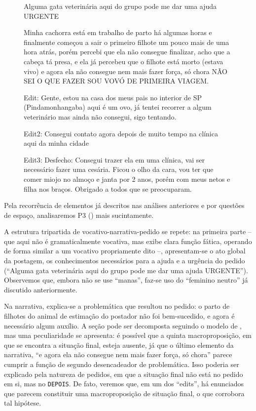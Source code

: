 \documentclass{textolivre-html}
\begin{document}
\begin{figure}[htbp]
\begin{minipage}{0.5\textwidth}
 Alguma gata veterinária aqui do grupo pode me dar uma ajuda URGENTE

Minha cachorra está em trabalho de parto há algumas horas e finalmente começou a sair o primeiro filhote um pouco mais de uma hora atrás, porém percebi que ela não consegue finalizar, acho que a cabeça tá presa, e ela já percebeu que o filhote está morto (estava vivo) e agora ela não consegue nem mais fazer força, só chora NÃO SEI O QUE FAZER SOU VOVÓ DE PRIMEIRA VIAGEM.

Edit: Gente, estou na casa dos meus pais no interior de SP (Pindamonhangaba) aqui é um ovo, já tentei recorrer a algum veterinário mas ainda não consegui, sigo tentando.

Edit2: Consegui contato agora depois de muito tempo na clínica aqui da minha cidade

Edit3: Desfecho: Consegui trazer ela em uma clínica, vai ser necessário fazer uma cesária. Ficou o olho da cara, vou ter que comer miojo no almoço e janta por 2 anos, porém com meus netos e filha nos braços. Obrigado a todos que se preocuparam.
\end{minipage}
\end{figure}

Pela recorrência de elementos já descritos nas análises anteriores e por questões de espaço, analisaremos P3 () mais sucintamente.

A estrutura tripartida de vocativo-narrativa-pedido se repete: na primeira parte – que aqui não é gramaticalmente vocativa, mas exibe clara função fática, operando de forma similar a um vocativo propriamente dito –, apresentam-se o ato global da postagem, os conhecimentos necessários para a ajuda e a urgência do pedido (“Alguma gata veterinária aqui do grupo pode me dar uma ajuda URGENTE”). Observemos que, embora não se use “manas”, faz-se uso do “feminino neutro” já discutido anteriormente.

Na narrativa, explica-se a problemática que resultou no pedido: o parto de filhotes do animal de estimação do postador não foi bem-sucedido, e agora é necessário algum auxílio. A seção pode ser decomposta seguindo o modelo de \textcite{adam1992}, mas uma peculiaridade se apresenta: é possível que a quinta macroproposição, em que se encontra a situação final, esteja ausente, já que o último elemento da narrativa, “e agora ela não consegue nem mais fazer força, só chora” parece cumprir a função de segundo desencadeador de problemática. Isso poderia ser explicado pela natureza de pedidos, em que a situação final não está no pedido em si, mas no \texttt{DEPOIS}. De fato, veremos que, em um dos “edits”, há enunciados que parecem constituir uma macroproposição de situação final, o que corrobora tal hipótese.
\end{document}
